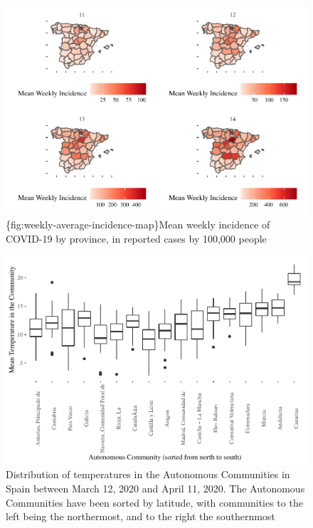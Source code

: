 \documentclass[]{elsarticle} %
\makeatletter
\def\maxwidth{\ifdim\Gin@nat@width>\linewidth\linewidth
\else\Gin@nat@width\fi}
\let\Oldincludegraphics\includegraphics
\renewcommand{\includegraphics}[1]{\Oldincludegraphics[width=\maxwidth]{#1}}
\makeatother
\begin{document}
\begin{figure}
\centering
\includegraphics{Climatic-Correlates-of-COVID19-Spain_files/figure-latex/weekly-average-incidence-map-1.pdf}
\caption{\{fig:weekly-average-incidence-map\}Mean weekly incidence of
COVID-19 by province, in reported cases by 100,000 people}
\end{figure}

\begin{figure}
\centering
\includegraphics{Climatic-Correlates-of-COVID19-Spain_files/figure-latex/descriptives-temperature-1.pdf}
\caption{\label{fig:descriptives-temperature} Distribution of
temperatures in the Autonomous Communities in Spain between March 12,
2020 and April 11, 2020. The Autonomous Communities have been sorted by
latitude, with communities to the left being the northermost, and to the
right the southernmost}
\end{figure}
\end{document}
